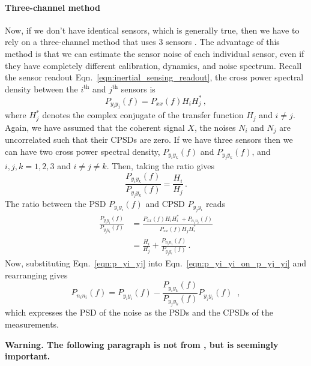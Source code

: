 \paragraph{Three-channel method}

Now, if we don't have identical sensors, which is generally true, then we have to rely on a three-channel method that uses 3 sensors \cite{Sleeman2006ThreeChannelCA}.
The advantage of this method is that we can estimate the sensor noise of each individual sensor, even if they have completely different calibration, dynamics, and noise spectrum.
Recall the sensor readout Eqn.~\eqref{eqn:inertial_sensing_readout}, the cross power spectral density between the $i^\mathrm{th}$ and $j^\mathrm{th}$ sensors is
\begin{equation}
	P_{y_iy_j}(f) = P_{xx}(f)H_iH_j^*\,,
\end{equation}
where $H_j^*$ denotes the complex conjugate of the transfer function $H_j$ and $i\neq j$.
Again, we have assumed that the coherent signal $X$, the noises $N_i$ and $N_j$ are uncorrelated such that their CPSDs are zero.
If we have three sensors then we can have two cross power spectral density, $P_{y_iy_k}(f)$ and $P_{y_jy_k}(f)$, and $i,j,k=1,2,3$ and $i\neq j\neq k$.
Then, taking the ratio gives
\begin{equation}
	\frac{P_{y_iy_k}(f)}{P_{y_jy_k}(f)} = \frac{H_i}{H_j}\,.
	\label{eqn:p_yi_yj}
\end{equation}
The ratio between the PSD $P_{y_iy_i}(f)$ and CPSD $P_{y_jy_i}$ reads
\begin{equation}
	\begin{split}
		\frac{P_{y_iy_i}(f)}{P_{y_jy_i}(f)} &= \frac{P_{xx}(f)H_iH_i^*\ + P_{n_in_i}(f)}{P_{xx}(f)H_jH_i^*} \\
		&= \frac{H_i}{H_j} + \frac{P_{n_in_i}(f)}{P_{y_jy_i}(f)}\,.
	\end{split}
	\label{eqn:p_yi_yi_on_p_yj_yi}
\end{equation}
Now, substituting Eqn.~\eqref{eqn:p_yi_yj} into Eqn.~\eqref{eqn:p_yi_yi_on_p_yj_yi} and rearranging gives
\begin{equation}
	\boxed{
		P_{n_in_i}(f) = P_{y_iy_i}(f) - \frac{P_{y_iy_k}(f)}{P_{y_jy_k}(f)}P_{y_jy_i}(f)\,
	}\,\ ,
	\label{eqn:p_ni_ni_3channel}
\end{equation}
which expresses the PSD of the noise as the PSDs and the CPSDs of the measurements.

\textbf{Warning. The following paragraph is not from \cite{Sleeman2006ThreeChannelCA}, but is seemingly important.}

